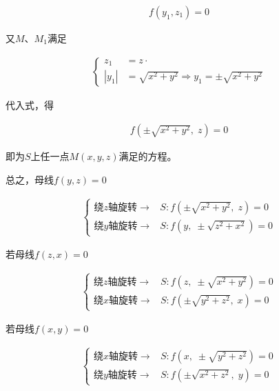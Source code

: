 \documentclass[12pt, a4paper]{article}
\numberwithin{equation}{section}
\begin{document}
    \begin{align}
        f\left(y_1, z_1\right) = 0
        \label{rotational-surface-2}
    \end{align}

    又\(M\)、\(M_1\)满足

    \begin{align*}
        \left\{\begin{aligned}
        z_1 & =z \cdot \\
        \left|y_1\right| & =\sqrt{x^2+y^2} \Rightarrow y_1= \pm \sqrt{x^2+y^2}
        \end{aligned}\right.
    \end{align*}

    代入式，得

    \begin{align*}
        f\left(\pm \sqrt{x^2 + y^2},\; z\right) = 0
    \end{align*}

    即为\(S\)上任一点\(M\left(x,y,z\right)\)满足的方程。

    总之，母线\(f\left(y, z\right) = 0\)

    \begin{align*}
        \left\{\begin{aligned}
        \text{绕\(z\)轴旋转}\rightarrow & S: f\left(\pm \sqrt{x^2 + y^2},\; z\right) = 0 \\
        \text{绕\(y\)轴旋转}\rightarrow & S: f\left(y,\; \pm \sqrt{z^2 + x^2}\right) = 0
        \end{aligned}\right.
    \end{align*}

    若母线\(f\left(z, x\right) = 0\)

    \begin{align*}
        \left\{\begin{aligned}
        \text{绕\(z\)轴旋转}\rightarrow & S: f\left(z,\; \pm \sqrt{x^2 + y^2}\right) = 0 \\
        \text{绕\(x\)轴旋转}\rightarrow & S: f\left(\pm \sqrt{y^2 + z^2},\; x\right) = 0
        \end{aligned}\right.
    \end{align*}

    若母线\(f\left(x, y\right) = 0\)

    \begin{align*}
        \left\{\begin{aligned}
        \text{绕\(x\)轴旋转}\rightarrow & S: f\left(x,\; \pm \sqrt{y^2 + z^2}\right) = 0 \\
        \text{绕\(y\)轴旋转}\rightarrow & S: f\left(\pm \sqrt{x^2 + z^2},\; y\right) = 0
        \end{aligned}\right.
    \end{align*}
\end{document}
